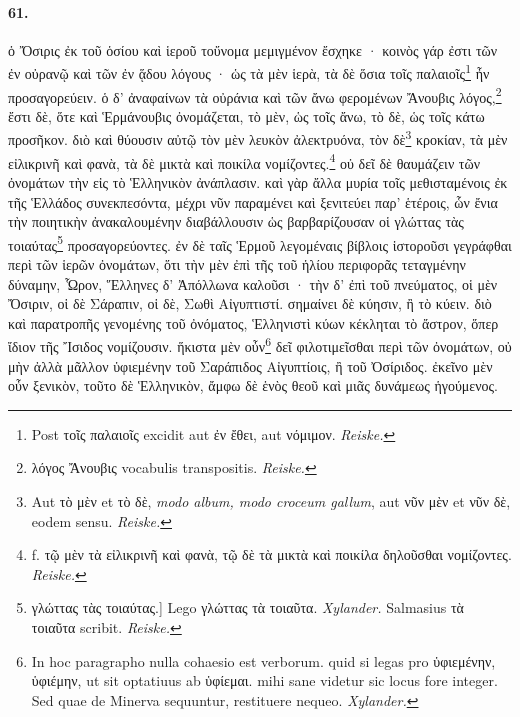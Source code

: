 \documentclass[a4paper, 11pt, oneside, polutonikogreek, german, landscape]{article}
\begin{document}
\paragraph{61.}
ὁ Ὄσιρις ἐκ τοῦ ὁσίου καὶ ἱεροῦ τοὔνομα μεμιγμένον ἔσχηκε · κοινὸς γάρ ἐστι τῶν ἐν οὐρανῷ καὶ τῶν ἐν ᾅδου λόγους · ὡς τὰ μὲν ἱερὰ, τὰ δὲ ὅσια τοῖς παλαιοῖς\footnote{Post τοῖς παλαιοῖς excidit aut ἐν ἔθει, aut νόμιμον. \emph{Reiske.}} ἦν προσαγορεύειν. ὁ δ' ἀναφαίνων τὰ οὐράνια καὶ τῶν ἄνω φερομένων Ἄνουβις λόγος,\footnote{λόγος Ἄνουβις vocabulis transpositis. \emph{Reiske.}} ἔστι δὲ, ὅτε καὶ Ἑρμάνουβις ὀνομάζεται, τὸ μὲν, ὡς τοῖς ἄνω, τὸ δὲ, ὡς τοῖς κάτω προσῆκον. διὸ καὶ θύουσιν αὐτῷ τὸν μὲν λευκὸν ἀλεκτρυόνα, τὸν δὲ\footnote{Aut τὸ μὲν et τὸ δὲ, \emph{modo album, modo croceum gallum}, aut νῦν μὲν et νῦν δὲ, eodem sensu. \emph{Reiske.}} κροκίαν, τὰ μὲν εἰλικρινῆ καὶ φανὰ, τὰ δὲ μικτὰ καὶ ποικίλα νομίζοντες.\footnote{f. τῷ μὲν τὰ εἰλικρινῆ καὶ φανὰ, τῷ δὲ τὰ μικτὰ καὶ ποικίλα δηλοῦσθαι νομίζοντες. \emph{Reiske.}} οὐ δεῖ δὲ θαυμάζειν τῶν ὀνομάτων τὴν εἰς τὸ Ἑλληνικὸν ἀνάπλασιν. καὶ γὰρ ἄλλα μυρία τοῖς μεθισταμένοις ἐκ τῆς Ἑλλάδος συνεκπεσόντα, μέχρι νῦν παραμένει καὶ ξενιτεύει παρ' ἑτέροις, ὧν ἔνια τὴν ποιητικὴν ἀνακαλουμένην διαβάλλουσιν ὡς βαρβαρίζουσαν οἱ γλώττας τὰς τοιαύτας\footnote{γλώττας τὰς τοιαύτας.] Lego γλώττας τὰ τοιαῦτα. \emph{Xylander.} Salmasius τὰ τοιαῦτα scribit. \emph{Reiske.}} προσαγορεύοντες. ἐν δὲ ταῖς Ἑρμοῦ λεγομέναις βίβλοις ἱστοροῦσι γεγράφθαι περὶ τῶν ἱερῶν ὀνομάτων, ὅτι τὴν μὲν ἐπὶ τῆς τοῦ ἡλίου περιφορᾶς τεταγμένην δύναμην, Ὧρον, Ἕλληνες δ' Ἀπόλλωνα καλοῦσι · τὴν δ' ἐπὶ τοῦ πνεύματος, οἱ μὲν Ὄσιριν, οἱ δὲ Σάραπιν, οἱ δὲ, Σωθὶ Αἰγυπτιστί. σημαίνει δὲ κύησιν, ἢ τὸ κύειν. διὸ καὶ παρατροπῆς γενομένης τοῦ ὀνόματος, Ἑλληνιστὶ κύων κέκληται τὸ ἄστρον, ὅπερ ἴδιον τῆς Ἴσιδος νομίζουσιν. ἥκιστα μὲν οὖν\footnote{In hoc paragrapho nulla cohaesio est verborum. quid si legas pro ὑφιεμένην, ὑφιέμην, ut sit optatiuus ab ὑφίεμαι. mihi sane videtur sic locus fore integer. Sed quae de Minerva sequuntur, restituere nequeo. \emph{Xylander.}} δεῖ φιλοτιμεῖσθαι περὶ τῶν ὀνομάτων, οὐ μὴν ἀλλὰ μᾶλλον ὑφιεμένην τοῦ Σαράπιδος Αἰγυπτίοις, ἢ τοῦ Ὀσίριδος. ἐκεῖνο μὲν οὖν ξενικὸν, τοῦτο δὲ Ἑλληνικὸν, ἄμφω δὲ ἑνὸς θεοῦ καὶ μιᾶς δυνάμεως ἡγούμενος.
\end{document}
